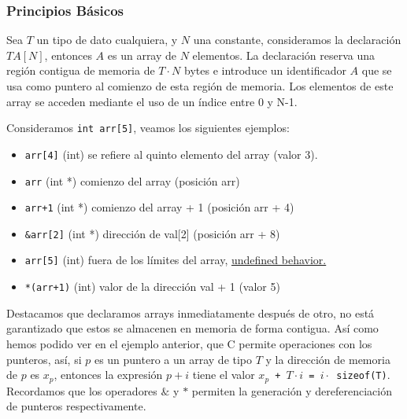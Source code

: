 \subsubsection{Principios Básicos}
Sea $T$ un tipo de dato cualquiera, y $N$ una constante, consideramos la declaración $T A[N]$, entonces $A$ es un array de $N$ elementos.
La declaración reserva una región contigua de memoria de $T \cdot N$ bytes e introduce un identificador $A$ que se usa como puntero
al comienzo de esta región de memoria. Los elementos de este array se acceden mediante el uso de un índice entre 0 y N-1.
\begin{ejemplo}
    Consideramos \texttt{int arr[5]}, veamos los siguientes ejemplos:
    \begin{center}
        
        \end{center}
    \begin{itemize}
        \item \texttt{arr[4]} (int) se refiere al quinto elemento del array (valor 3).
        \item \texttt{arr} (int *) comienzo del array (posición arr)
        \item \texttt{arr+1} (int *) comienzo del array + 1 (posición arr + 4) 
        \item \texttt{\&arr[2]} (int *) dirección de val[2] (posición arr + 8)
        \item \texttt{arr[5]} (int) fuera de los límites del array, \href{https://en.cppreference.com/w/c/language/behavior}{undefined behavior.}
        \item \texttt{*(arr+1)} (int) valor de la dirección val + 1 (valor 5)
    \end{itemize}
\end{ejemplo}
Destacamos que declaramos arrays inmediatamente después de otro, no está garantizado que estos se almacenen en memoria de forma contigua. Así como hemos podido ver en el ejemplo anterior,
que C permite operaciones con los punteros, así, si $p$ es un puntero a un array de tipo $T$ y la dirección de memoria de $p$ es $x_p$, entonces la expresión $p + i$ tiene el valor \texttt{$x_p$ +  $T \cdot i$ = $i \cdot$ sizeof(T)}.
Recordamos que los operadores $\& $ y $*$ permiten la generación y dereferenciación de punteros respectivamente.
